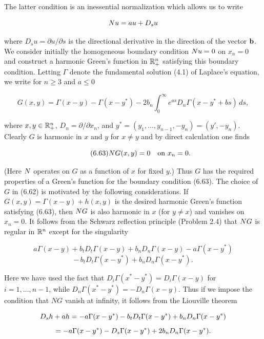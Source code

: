 The latter condition is an inessential normalization which allows us to write

\[
N u = a u + D_s u
\]

where $D_s u = \partial u/\partial s$ is the directional derivative in the direction of the vector $\mathbf{b}$.
We consider initially the homogeneous boundary condition $N u = 0$ on $x_n = 0$
and construct a harmonic Green's function in $\mathbb{R}_+^n$ satisfying this boundary condition. Letting $\Gamma$ denote the fundamental solution (4.1) of Laplace's equation, we
write for $n \geq 3$ and $a \leq 0$

\begin{equation}
\tag{6.62}
G(x,y)=\Gamma(x-y)-\Gamma(x-y^*)-2b_n\int_0^\infty e^{as} D_n\Gamma(x-y^*+bs)\,ds,
\end{equation}

where $x, y \in \mathbb{R}_+^n$, $D_n = \partial/\partial x_n$, and $y^*=(y_1,\ldots,y_{n-1},-y_n)=(y',-y_n)$. Clearly
$G$ is harmonic in $x$ and $y$ for $x\neq y$ and by direct calculation one finds

\begin{equation}
\tag{6.63}
N G(x,y)=0 \quad \text{on } x_n=0.
\end{equation}

(Here $N$ operates on $G$ as a function of $x$ for fixed $y$.) Thus $G$ has the required
properties of a Green's function for the boundary condition (6.63).
The choice of $G$ in (6.62) is motivated by the following considerations. If
$G(x,y)=\Gamma(x-y)+h(x,y)$ is the desired harmonic Green's function satisfying
(6.63), then $N G$ is also harmonic in $x$ (for $y\neq x$) and vanishes on $x_n = 0$. It follows
from the Schwarz reflection principle (Problem 2.4) that $N G$ is regular in $\mathbb{R}^n$
except for the singularity

\[
a\Gamma(x-y)+b_t D_t\Gamma(x-y)+b_n D_n\Gamma(x-y)-a\Gamma(x-y^*)
\]
\[
-\, b_t D_t\Gamma(x-y^*)+b_n D_n\Gamma(x-y^*).
\]


\pagestyle{empty}



Here we have used the fact that $D_i\Gamma(x^* - y^*) = D_i\Gamma(x - y)$ for $i = 1, \ldots, n - 1$,
while $D_n\Gamma(x^* - y^*) = -D_n\Gamma(x - y)$. Thus if we impose the condition that $NG$
vanish at infinity, it follows from the Liouville theorem

\[
D_s h + ah = -a\Gamma(x - y^*) - b_t D_t\Gamma(x - y^*) + b_n D_n\Gamma(x - y^*)
\]
\[
= -a\Gamma(x - y^*) - D_s\Gamma(x - y^*) + 2b_n D_n\Gamma(x - y^*).
\]

